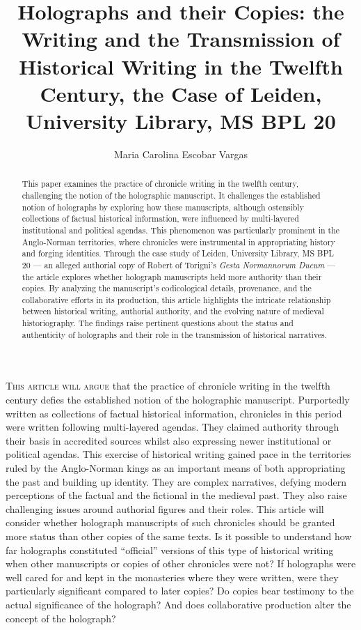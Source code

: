 \documentclass{article}
\author{Maria Carolina Escobar Vargas}
\title{Holographs and their Copies: the Writing and the Transmission of
Historical Writing in the Twelfth Century, the Case of Leiden,
University Library, MS BPL 20}
\begin{document}
\maketitle

\begin{abstract}
This paper examines the practice of chronicle writing in the twelfth century, challenging the notion of the holographic manuscript. It challenges the established notion of holographs by exploring how these manuscripts, although ostensibly collections of factual historical information, were influenced by multi-layered institutional and political agendas. This phenomenon was particularly prominent in the Anglo-Norman territories, where chronicles were instrumental in appropriating history and forging identities. Through the case study of Leiden, University Library, MS BPL 20 –– an alleged authorial copy of Robert of Torigni’s \emph{Gesta Normannorum Ducum} –– the article explores whether holograph manuscripts held more authority than their copies. By analyzing the manuscript's codicological details, provenance, and the collaborative efforts in its production, this article highlights the intricate relationship between historical writing, authorial authority, and the evolving nature of medieval historiography. The findings raise pertinent questions about the status and authenticity of holographs and their role in the transmission of historical narratives.
\end{abstract}

\section*{} 
\textsc{This article will argue} that the practice of chronicle writing in the
twelfth century defies the established notion of the holographic
manuscript. Purportedly written as collections of factual historical
information, chronicles in this period were written following
multi-layered agendas. They claimed authority through their basis in
accredited sources whilst also expressing newer institutional or
political agendas. This exercise of historical writing gained pace in
the territories ruled by the Anglo-Norman kings as an important means of
both appropriating the past and building up identity. They are complex
narratives, defying modern perceptions of the factual and the fictional
in the medieval past. They also raise challenging issues around
authorial figures and their roles. This article will consider whether
holograph manuscripts of such chronicles should be granted more status
than other copies of the same texts. Is it possible to understand how
far holographs constituted ``official'' versions of this type of
historical writing when other manuscripts or copies of other chronicles
were not? If holographs were well cared for and kept in the monasteries
where they were written, were they particularly significant compared to
later copies? Do copies bear testimony to the actual significance of the
holograph? And does collaborative production alter the concept of the
holograph?
\end{document}
